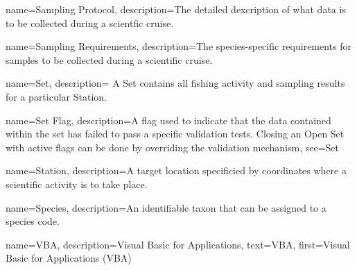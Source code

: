  {
  name=Sampling Protocol,
  description={The detailed dexcription of what data is to be collected during a scientfic cruise.}
}

 {
  name=Sampling Requirements,
  description={The species-specific requirements for samples to be collected during a scientific cruise.}
}

 {
  name=Set,
  description={
    A Set contains all fishing activity and sampling results for a particular \gls{Station}.
  }
}

 {
  name=Set Flag,
  description={A flag used to indicate that the data contained within the set has failed to pass a specific validation tests.
  Closing an \gls{Open Set} with active flags can be done by overriding the validation mechanism},
  see=\gls{Set}
  }

 {
  name=Station,
  description={A target location specificied by coordinates where a scientific activity is to take place. }
}

 {
  name=Species,
  description={An identifiable taxon that can be assigned to a species code.}
}

 {
  name=VBA,
  description={Visual Basic for Applications},
  text={VBA},
  first={Visual Basic for Applications (VBA)}
}

\glsaddall
\glsaddallunused
